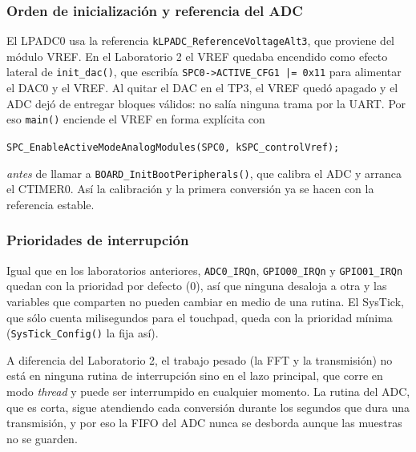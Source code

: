 \documentclass[11pt,a4paper]{article}
\begin{document}

\subsubsection{Orden de inicialización y referencia del ADC}

El LPADC0 usa la referencia \texttt{kLPADC\_ReferenceVoltageAlt3}, que
proviene del módulo VREF. En el Laboratorio 2 el VREF quedaba encendido como
efecto lateral de \texttt{init\_dac()}, que escribía
\texttt{SPC0->ACTIVE\_CFG1 |= 0x11} para alimentar el DAC0 y el VREF. Al
quitar el DAC en el TP3, el VREF quedó apagado y el ADC dejó de entregar
bloques válidos: no salía ninguna trama por la UART. Por eso
\texttt{main()} enciende el VREF en forma explícita con
\begin{center}
\texttt{SPC\_EnableActiveModeAnalogModules(SPC0, kSPC\_controlVref);}
\end{center}
\emph{antes} de llamar a \texttt{BOARD\_InitBootPeripherals()}, que calibra el
ADC y arranca el CTIMER0. Así la calibración y la primera conversión ya se hacen
con la referencia estable.

\subsubsection{Prioridades de interrupción}

Igual que en los laboratorios anteriores, \texttt{ADC0\_IRQn},
\texttt{GPIO00\_IRQn} y \texttt{GPIO01\_IRQn} quedan con la prioridad por
defecto (0), así que ninguna desaloja a otra y las variables que comparten
no pueden cambiar en medio de una rutina. El SysTick, que sólo cuenta
milisegundos para el touchpad, queda con la prioridad mínima
(\texttt{SysTick\_Config()} la fija así).

A diferencia del Laboratorio 2, el trabajo pesado (la FFT y la transmisión)
no está en ninguna rutina de interrupción sino en el lazo principal, que
corre en modo \emph{thread} y puede ser interrumpido en cualquier momento.
La rutina del ADC, que es corta, sigue atendiendo cada conversión durante
los segundos que dura una transmisión, y por eso la FIFO del ADC nunca se
desborda aunque las muestras no se guarden.

\label{sec:teoria}
\end{document}
